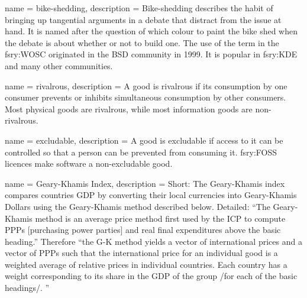  { name = {bike-shedding},
  description = {Bike-shedding describes the habit of bringing up
    tangential arguments in a debate that distract from the issue at
    hand. It is named after the question of which colour to paint the
    bike shed when the debate is about whether or not to build
    one. The use of the term in the \gls{fsry:WOSC} originated in the
    BSD community in 1999. It is popular in \gls{fsry:KDE} and
    many other communities.}}

 { name = {rivalrous}, description =
  {A good is rivalrous if its consumption by one consumer prevents or
    inhibits simultaneous consumption by other consumers. Most
    physical goods are rivalrous, while most information goods are
    non-rivalrous.}}

 { name = {excludable}, description
  = {A good is excludable if access to it can be controlled so that a
    person can be prevented from consuming it. \gls{fsry:FOSS}
    licences make software a non-excludable good.}}

 { name = {Geary-Khamis Index}, description
    = {Short: The Geary-Khamis index compares countries GDP by converting
    their local currencies into Geary-Khamis Dollars using the Geary-Khamis method described below. Detailed: ``The Geary-Khamis method is an average price method first used by the ICP to compute PPPs [purchasing power parties]
    and real final expenditures above the basic heading.''\cite{fsry:oecd-geary-khamis-2007} Therefore ``the G-K method yields a vector of international prices and a vector of PPPs such that the international price for an individual good is a weighted average of relative prices in individual countries.
    Each country has a weight corresponding to its share in the GDP of the group /for each of the basic headings/.
    ''\cite{fsry:sensitivity-ppp}}}
